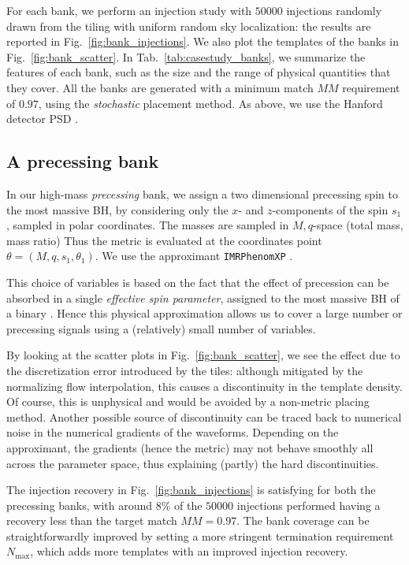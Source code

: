 \documentclass[twocolumn,showpacs,preprintnumbers,nofootinbib,prd,
superscriptaddress,10pt]{revtex4-2}
\begin{document}
For each bank, we perform an injection study with $50000$ injections randomly drawn from the tiling with uniform random sky localization: the results are reported in Fig.~\ref{fig:bank_injections}. We also plot the templates of the banks in Fig.~\ref{fig:bank_scatter}.
In Tab.~\ref{tab:casestudy_banks}, we summarize the features of each bank, such as the size and the range of physical quantities that they cover.
All the banks are generated with a minimum match $MM$ requirement of $0.97$, using the {\it stochastic} placement method.
As above, we use the Hanford detector PSD \cite{O3a_PSDs}.

\subsection{A precessing bank}\label{sec:precessing_bank}
	
In our high-mass {\it precessing} bank, we assign a two dimensional precessing spin to the most massive BH, by considering only the $x$- and $z$-components of the spin $s_1$, sampled in polar coordinates. The masses are sampled in $M,q$-space (total mass, mass ratio)   Thus the metric is evaluated at the coordinates point $\theta = (M, q, s_1, \theta_1)$. We use the approximant \texttt{IMRPhenomXP} \cite{Pratten:2020ceb}.

This choice of variables is based on the fact that the effect of precession can be absorbed in a single {\it effective spin parameter}, assigned to the most massive BH of a binary \cite{PhysRevD.91.024043, PhysRevD.103.083022}. Hence this physical approximation allows us to cover a large number or precessing signals using a (relatively) small number of variables.

By looking at the scatter plots in Fig.~\ref{fig:bank_scatter}, we see the effect due to the discretization error introduced by the tiles: although mitigated by the normalizing flow interpolation, this causes a discontinuity in the template density. Of course, this is unphysical and would be avoided by a non-metric placing method.
Another possible source of discontinuity can be traced back to numerical noise in the numerical gradients of the waveforms. Depending on the approximant, the gradients (hence the metric) may not behave smoothly all across the parameter space, thus explaining (partly) the hard discontinuities.

The injection recovery in Fig.~\ref{fig:bank_injections} is satisfying for both the precessing banks, with around $8\%$ of the $50000$ injections performed having a recovery less than the target match $MM = 0.97$.
The bank coverage can be straightforwardly improved by setting a more stringent termination requirement $N_\text{max}$, which adds more templates with an improved injection recovery.
\end{document}
